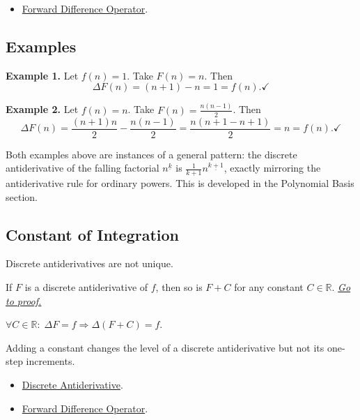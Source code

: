 \begin{dependencies}
\begin{itemize}
  \item \hyperref[def:forward-difference]{Forward Difference Operator}.
\end{itemize}
\end{dependencies}
\subsection*{Examples}

\begin{example*}
\textbf{Example 1.} Let \(f(n) = 1\). Take \(F(n) = n\). Then
\[
\Delta F(n) = (n+1) - n = 1 = f(n). \checkmark
\]

\textbf{Example 2.} Let \(f(n) = n\). Take \(F(n) = \tfrac{n(n-1)}{2}\). Then
\[
\Delta F(n)
= \frac{(n+1)n}{2} - \frac{n(n-1)}{2}
= \frac{n(n+1-n+1)}{2}
= n = f(n). \checkmark
\]
\end{example*}

\begin{remark*}[Interpretation]
Both examples above are instances of a general pattern: the discrete
antiderivative of the falling factorial \(n^{\underline{k}}\) is
\(\tfrac{1}{k+1}n^{\underline{k+1}}\), exactly mirroring the antiderivative
rule for ordinary powers. This is developed in the Polynomial Basis section.
\end{remark*}

\subsection*{Constant of Integration}

\begin{exposition}
Discrete antiderivatives are not unique.
\end{exposition}

\begin{proposition}
\label{prop:constant-of-integration}
If \(F\) is a discrete antiderivative of \(f\), then so is \(F + C\)
for any constant \(C \in \mathbb{R}\).
\hyperref[prf:constant-of-integration]{\textit{Go to proof.}}
\end{proposition}

\begin{remark*}
\(\forall C \in \mathbb{R}:\;
\Delta F = f \Rightarrow \Delta(F+C) = f\).
\end{remark*}

\begin{remark*}[Interpretation]
Adding a constant changes the level of a discrete antiderivative but not its
one-step increments.
\end{remark*}

\begin{dependencies}
\begin{itemize}
  \item \hyperref[def:discrete-antiderivative]{Discrete Antiderivative}.
  \item \hyperref[def:forward-difference]{Forward Difference Operator}.
\end{itemize}
\end{dependencies}
